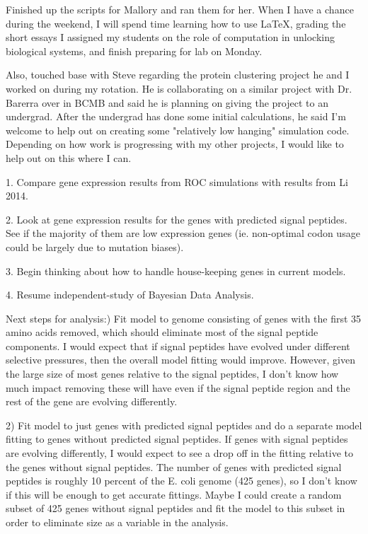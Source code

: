 \documentclass[11pt]{labbook}
\begin{document}
Finished up the scripts for Mallory and ran them for her. When I have a chance during the weekend, I will spend time learning how to use LaTeX, grading the short essays I assigned my students on the role of computation in unlocking biological systems, and finish preparing for lab on Monday.


Also, touched base with Steve regarding the protein clustering project he and I worked on during my rotation. He is collaborating on a similar project with Dr. Barerra over in BCMB and said he is planning on giving the project to an undergrad. After the undergrad has done some initial calculations, he said I'm welcome to help out on creating some "relatively low hanging" simulation code. Depending on how work is progressing with my other projects, I would like to help out on this where I can. 

1. Compare gene expression results from ROC simulations with results from Li 2014.

2. Look at gene expression results for the genes with predicted signal peptides. See if the majority of them are low expression genes (ie. non-optimal codon usage could be largely due to mutation biases).

3. Begin thinking about how to handle house-keeping genes in current models.

4. Resume independent-study of Bayesian Data Analysis.


Next steps for analysis:) Fit model to genome consisting of genes with the first 35 amino acids removed, which should eliminate most of the signal peptide components. I would expect that if signal peptides have evolved under different selective pressures, then the overall model fitting would improve. However, given the large size of most genes relative to the signal peptides, I don't know how much impact removing these will have even if the signal peptide region and the rest of the gene are evolving differently. 

2) Fit model to just genes with predicted signal peptides and do a separate model fitting to genes without predicted signal peptides. If genes with signal peptides are evolving differently, I would expect to see a drop off in the fitting relative to the genes without signal peptides. The number of genes with predicted signal peptides is roughly 10 percent of the E. coli genome (425 genes), so I don't know if this will be enough to get accurate fittings. Maybe I could create a random subset of 425 genes without signal peptides and fit the model to this subset in order to eliminate size as a variable in the analysis.
\end{document}

